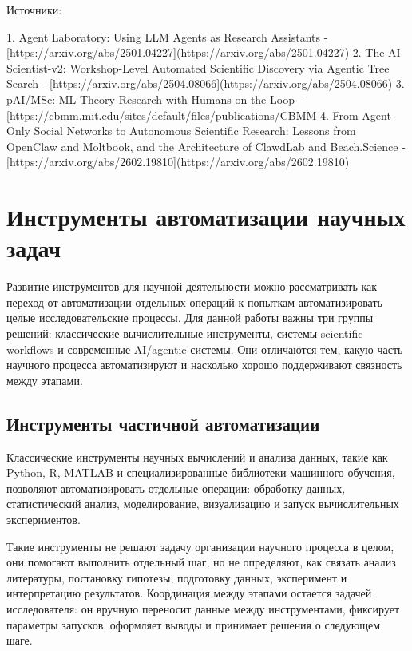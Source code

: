Источники:

1. Agent Laboratory: Using LLM Agents as Research Assistants - [https://arxiv.org/abs/2501.04227](https://arxiv.org/abs/2501.04227)
2. The AI Scientist-v2: Workshop-Level Automated Scientific Discovery via Agentic Tree Search - [https://arxiv.org/abs/2504.08066](https://arxiv.org/abs/2504.08066)
3. pAI/MSc: ML Theory Research with Humans on the Loop - [https://cbmm.mit.edu/sites/default/files/publications/CBMM%
4. From Agent-Only Social Networks to Autonomous Scientific Research: Lessons from OpenClaw and Moltbook, and the Architecture of ClawdLab and Beach.Science - [https://arxiv.org/abs/2602.19810](https://arxiv.org/abs/2602.19810)


\section{Инструменты автоматизации научных задач}

Развитие инструментов для научной деятельности можно рассматривать как переход от автоматизации отдельных операций к попыткам автоматизировать целые исследовательские процессы. Для данной работы важны три группы решений: классические вычислительные инструменты, системы scientific workflows и современные AI/agentic-системы. Они отличаются тем, какую часть научного процесса автоматизируют и насколько хорошо поддерживают связность между этапами.

\subsection{Инструменты частичной автоматизации}

Классические инструменты научных вычислений и анализа данных, такие как Python, R, MATLAB и специализированные библиотеки машинного обучения, позволяют автоматизировать отдельные операции: обработку данных, статистический анализ, моделирование, визуализацию и запуск вычислительных экспериментов. 

Такие инструменты не решают задачу организации научного процесса в целом, они помогают выполнить отдельный шаг, но не определяют, как связать анализ литературы, постановку гипотезы, подготовку данных, эксперимент и интерпретацию результатов. Координация между этапами остается задачей исследователя: он вручную переносит данные между инструментами, фиксирует параметры запусков, оформляет выводы и принимает решения о следующем шаге.

